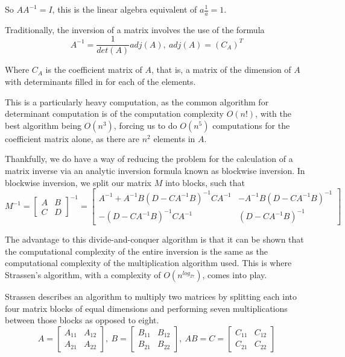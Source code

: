 \documentclass[12pt, letterpaper]{article}
\theoremstyle{remark}
\theoremstyle{remark}
\begin{document}
    So \(AA^{-1} = I\), this is the linear algebra equivalent of \(a\frac{1}{a} = 1\).

    \bigskip

    Traditionally, the inversion of a matrix involves the use of the formula
    \[A^{-1} = \frac{1}{det(A)}adj(A),\ adj(A) = (C_{A})^T\]

    Where \(C_A\) is the coefficient matrix of \(A\), that is, a matrix of 
    the dimension of \(A\) with determinants filled in for each of the elements.

    This is a particularly heavy computation, as the common algorithm for determinant
    computation is of the computation complexity \(O(n!)\), with the best algorithm 
    being \(O(n^3)\), forcing us to do \(O(n^5)\) computations for the coefficient 
    matrix alone, as there are \(n^2\) elements in \(A\).

    \bigskip

    Thankfully, we do have a way of reducing the problem for the calculation of 
    a matrix inverse via an analytic inversion formula known as blockwise inversion. 
    In blockwise inversion, we split our matrix \(M\) into blocks, such that
    \[M^{-1} = \begin{bmatrix*}
        A & B \\
        C & D
    \end{bmatrix*}^{-1} = 
    \begin{bmatrix*}
        A^{-1} + A^{-1}B(D - CA^{-1}B)^{-1}CA^{-1} & -A^{-1}B(D - CA^{-1}B)^{-1} \\
        -(D - CA^{-1}B)^{-1}CA^{-1} & (D - CA^{-1}B)^{-1}
    \end{bmatrix*}\]
    
    The advantage to this divide-and-conquer algorithm is that it can be shown 
    that the computational complexity of the entire inversion is the same as the
    computational complexity of the multiplication algorithm used. This is where 
    Strassen's algorithm, with a complexity of \(O(n^{log_27})\), comes into play.

    \bigskip

    Strassen describes an algorithm to multiply two matrices by splitting
    each into four matrix blocks of equal dimensions and performing seven multiplications
    between those blocks as opposed to eight.
    \[A = \begin{bmatrix*}
        A_{11} & A_{12} \\
        A_{21} & A_{22}
    \end{bmatrix*},\ B =
    \begin{bmatrix*}
        B_{11} & B_{12} \\
        B_{21} & B_{22}
    \end{bmatrix*},\ AB = C =
    \begin{bmatrix*}
        C_{11} & C_{12} \\
        C_{21} & C_{22}
    \end{bmatrix*}\]
\end{document}
